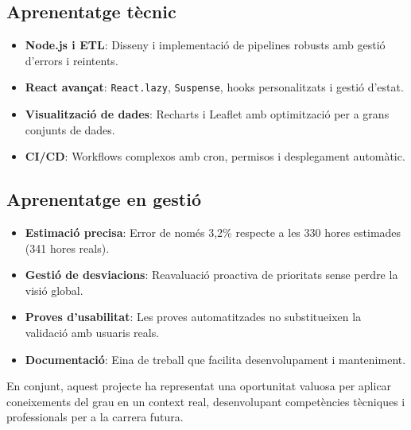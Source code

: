 \subsection{Aprenentatge tècnic}

\begin{itemize}
    \item \textbf{Node.js i ETL}: Disseny i implementació de pipelines robusts amb gestió d'errors i reintents.
    \item \textbf{React avançat}: \texttt{React.lazy}, \texttt{Suspense}, hooks personalitzats i gestió d'estat.
    \item \textbf{Visualització de dades}: Recharts i Leaflet amb optimització per a grans conjunts de dades.
    \item \textbf{CI/CD}: Workflows complexos amb cron, permisos i desplegament automàtic.
\end{itemize}

\subsection{Aprenentatge en gestió}

\begin{itemize}
    \item \textbf{Estimació precisa}: Error de només 3,2\% respecte a les 330 hores estimades (341 hores reals).
    \item \textbf{Gestió de desviacions}: Reavaluació proactiva de prioritats sense perdre la visió global.
    \item \textbf{Proves d'usabilitat}: Les proves automatitzades no substitueixen la validació amb usuaris reals.
    \item \textbf{Documentació}: Eina de treball que facilita desenvolupament i manteniment.
\end{itemize}

En conjunt, aquest projecte ha representat una oportunitat valuosa per aplicar coneixements del grau en un context real, desenvolupant competències tècniques i professionals per a la carrera futura.

